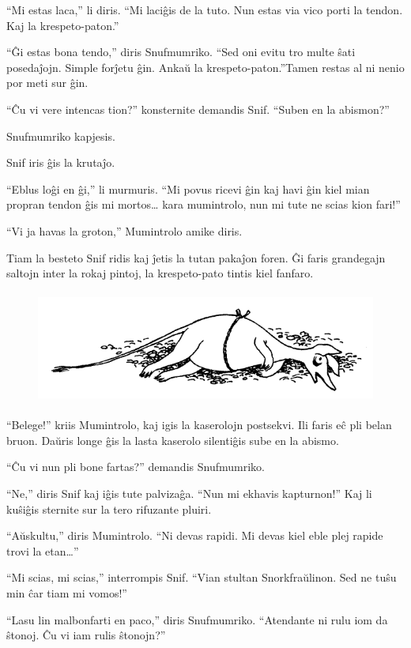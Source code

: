 ``Mi estas laca,'' li diris. ``Mi laciĝis de la tuto. Nun estas via vico porti la tendon. Kaj la krespeto-paton.''

``Ĝi estas bona tendo,'' diris Snufmumriko. ``Sed oni evitu tro multe ŝati posedaĵojn. Simple forĵetu ĝin. Ankaŭ la krespeto-paton.''Tamen restas al ni nenio por meti sur ĝin.

``Ĉu vi vere intencas tion?'' konsternite demandis Snif. ``Suben en la abismon?''

Snufmumriko kapjesis.

Snif iris ĝis la krutaĵo.

``Eblus loĝi en ĝi,'' li murmuris. ``Mi povus ricevi ĝin kaj havi ĝin kiel mian propran tendon ĝis mi mortos{\ldots} kara mumintrolo, nun mi tute ne scias kion fari!''

``Vi ja havas la groton,'' Mumintrolo amike diris.

Tiam la besteto Snif ridis kaj ĵetis la tutan pakaĵon foren. Ĝi faris grandegajn saltojn inter la rokaj pintoj, la krespeto-pato tintis kiel fanfaro.

\begin{figure}[htbp]
\centering
\includegraphics[width=350pt,height=105pt]{5-1.png}
\caption{}
\label{5-1}
\end{figure}

``Belege!'' kriis Mumintrolo, kaj igis la kaserolojn postsekvi. Ili faris eĉ pli belan bruon. Daŭris longe ĝis la lasta kaserolo silentiĝis sube en la abismo.

``Ĉu vi nun pli bone fartas?'' demandis Snufmumriko.

``Ne,'' diris Snif kaj iĝis tute palvizaĝa. ``Nun mi ekhavis kapturnon!'' Kaj li kuŝiĝis sternite sur la tero rifuzante pluiri.

``Aŭskultu,'' diris Mumintrolo. ``Ni devas rapidi. Mi devas kiel eble plej rapide trovi la etan{\ldots}''

``Mi scias, mi scias,'' interrompis Snif. ``Vian stultan Snorkfraŭlinon. Sed ne tuŝu min ĉar tiam mi vomos!''

``Lasu lin malbonfarti en paco,'' diris Snufmumriko. ``Atendante ni rulu iom da ŝtonoj. Ĉu vi iam rulis ŝtonojn?''

